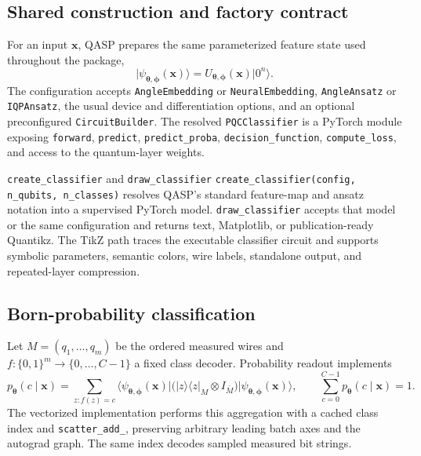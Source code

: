 \documentclass[10pt]{article}
\newcommand{\code}[1]{\texttt{#1}}
\begin{document}
\subsection{Shared construction and factory contract}
\label{sec:classifier-factory}

For an input $\bm x$, QASP prepares the same parameterized feature state used
throughout the package,
\begin{equation}
  \lvert\psi_{\bm\theta,\bm\phi}(\bm x)\rangle
  =U_{\bm\theta,\bm\phi}(\bm x)\lvert0^n\rangle.
  \label{eq:classifier-feature-state}
\end{equation}
The configuration accepts 
\code{AngleEmbedding} or \code{NeuralEmbedding}, \code{AngleAnsatz} or
\code{IQPAnsatz}, the usual device and differentiation options, and an
optional preconfigured \code{CircuitBuilder}.  The resolved
\code{PQCClassifier} is a PyTorch module exposing \code{forward},
\code{predict}, \code{predict\_proba}, \code{decision\_function},
\code{compute\_loss}, and access to the quantum-layer weights.

\begin{qaspfeature}{\code{create\_classifier} and \code{draw\_classifier}}
\code{create\_classifier(config, n\_qubits, n\_classes)} resolves QASP's
standard feature-map and ansatz notation into a supervised PyTorch model.
\code{draw\_classifier} accepts that model or the same configuration and
returns text, Matplotlib, or publication-ready Quantikz.  The TikZ path traces
the executable classifier circuit and supports symbolic parameters, semantic
colors, wire labels, standalone output, and repeated-layer compression.
\end{qaspfeature}

\subsection{Born-probability classification}
\label{sec:classifier-born}

Let $M=(q_1,\ldots,q_m)$ be the ordered measured wires and
$f:\{0,1\}^m\rightarrow\{0,\ldots,C-1\}$ a fixed class decoder.  Probability
readout implements
\begin{equation}
  p_{\bm\theta}(c\mid\bm x)
  =\sum_{z:f(z)=c}
    \langle\psi_{\bm\theta,\bm\phi}(\bm x)\rvert
    \bigl(\lvert z\rangle\langle z\rvert_M\otimes I_{\bar M}\bigr)
    \lvert\psi_{\bm\theta,\bm\phi}(\bm x)\rangle,
  \qquad \sum_{c=0}^{C-1}p_{\bm\theta}(c\mid\bm x)=1.
  \label{eq:classifier-born-probabilities}
\end{equation}
The vectorized implementation performs this aggregation with a cached class
index and \code{scatter\_add\_}, preserving arbitrary leading batch axes and
the autograd graph.  The same index decodes sampled measured bit strings.
\end{document}
